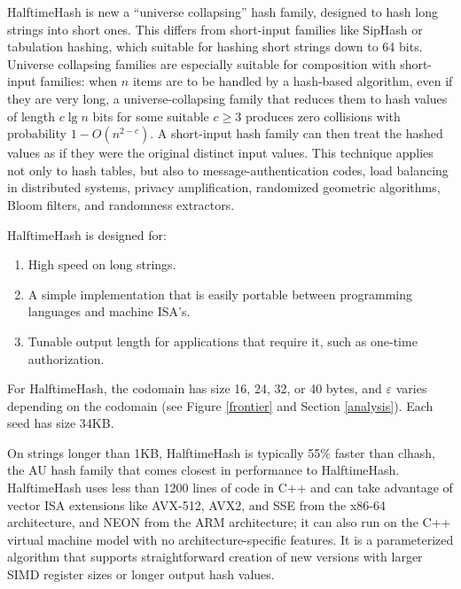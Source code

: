 \documentclass[runningheads]{llncs}
\begin{document}
HalftimeHash is new a ``universe collapsing'' hash family, designed to hash long strings into short ones. \cite{linear-hash-functions,hashing-without-primes-revisited,cuckoo-journal}
This differs from short-input families like SipHash or tabulation hashing, which suitable for hashing short strings down to 64 bits. \cite{siphash,tabulation}
Universe collapsing families are especially suitable for composition with short-input families: when $n$ items are to be handled by a hash-based algorithm, even if they are very long, a universe-collapsing family that reduces them to hash values of length $c \lg n$ bits for some suitable $c \geq 3$ produces zero collisions with probability $1-O(n^{2-c})$.
A short-input hash family can then treat the hashed values as if they were the original distinct input values. \cite{universe-collapse-linear-probing,siphash,tabulation,simple-hash-functions-work}
This technique applies not only to hash tables, but also to message-authentication codes, load balancing in distributed systems, privacy amplification, randomized geometric algorithms, Bloom filters, and randomness extractors. \cite{poly1305,chord,privacy-amplification,random-closest-pair,simple-hash-functions-work,fuzzy-extractors}

HalftimeHash is designed for:

\begin{enumerate}
\item High speed on long strings.
\item A simple implementation that is easily portable between programming languages and machine ISA's.
\item Tunable output length for applications that require it, such as one-time authorization. \cite{nacl}
\end{enumerate}

For HalftimeHash, the codomain has size 16, 24, 32, or 40 bytes, and $\varepsilon$ varies depending on the codomain (see Figure \ref{frontier} and Section \ref{analysis}).
Each seed has size 34KB.

On strings longer than 1KB, HalftimeHash is typically 55\% faster than clhash, the AU hash family that comes closest in performance to HalftimeHash.
HalftimeHash uses less than 1200 lines of code in C++ and can take advantage of vector ISA extensions like AVX-512, AVX2, and SSE from the x86-64 architecture, and NEON from the ARM architecture; it can also run on the C++ virtual machine model with no architecture-specific features.
It is a parameterized algorithm that supports straightforward creation of new versions with larger SIMD register sizes or longer output hash values.
\end{document}
